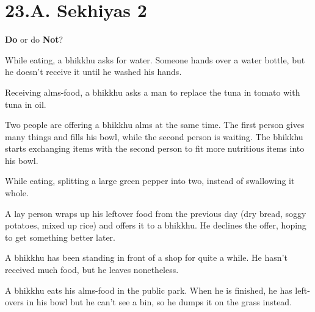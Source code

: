 \chapter{23.A. Sekhiyas 2}
\renewcommand*{\theChapterTitle}{23.A. Sekhiyas 2}

\begin{exam}{\autoExamName}

  \begin{problem*}
    \textbf{Do} or do \textbf{Not}?

    \bigskip

    \begin{parts}

    \item {} While eating, a bhikkhu asks for water. Someone hands over a
      water bottle, but he doesn't receive it until he washed his hands.

    \bigskip

    \item {} Receiving alms-food, a bhikkhu asks a man to replace the tuna
      in tomato with tuna in oil.

    \bigskip

    \item {} Two people are offering a bhikkhu alms at the same time. The
      first person gives many things and fills his bowl, while the second person
      is waiting. The bhikkhu starts exchanging items with the second person to
      fit more nutritious items into his bowl.

    \bigskip

    \item {} While eating, splitting a large green pepper into two, instead
    of swallowing it whole.

    \bigskip

    \item {} A lay person wraps up his leftover food from the previous day
      (dry bread, soggy potatoes, mixed up rice) and offers it to a bhikkhu. He
      declines the offer, hoping to get something better later.

    \bigskip

    \item {} A bhikkhu has been standing in front of a shop for quite a while.
    He hasn't received much food, but he leaves nonetheless.

    \bigskip

    \item {} A bhikkhu eats his alms-food in the public park. When he is
      finished, he has left-overs in his bowl but he can't see a bin, so he
      dumps it on the grass instead.


\end{parts}
\end{problem*}
\end{exam}
